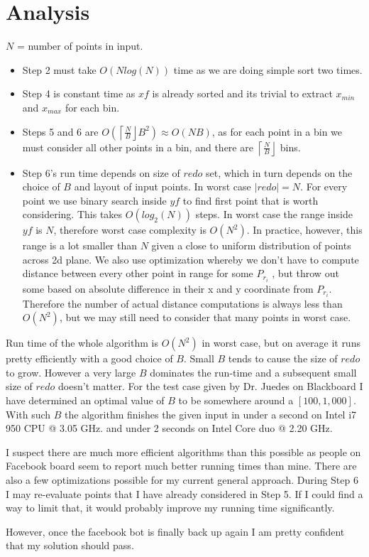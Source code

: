 \documentclass[11pt]{article}
\begin{document}
\section{Analysis}

$N$ = number of points in input.  
\begin{itemize}
\item Step 2 must take $O(Nlog(N))$ time as we are doing simple sort two times.  
\item Step 4 is constant time as $xf$ is already sorted and its trivial to extract $x_{min}$ and $x_{max}$ for each bin.  
\item Steps 5 and 6 are $O( \left \lceil \frac{N}{B} \right \rfloor B^2) \approx  O(NB) $, as for each point in a bin we must consider all other points in a bin, and there are $  \left \lceil \frac{N}{B} \right \rfloor $ bins.
\item Step 6's run time depends on size of $redo$ set, which in turn depends on the choice of $B$ and layout of input points.  In worst case $|redo|=N$.  For every point we use binary search inside $yf$ to find first point that is worth considering.  This takes $O(log_{2}(N))$ steps.  In worst case the range inside $yf$ is $N$, therefore worst case complexity is $O(N^2)$.  In practice, however, this range is a lot smaller than $N$ given a close to uniform distribution of points across 2d plane.  We also use optimization whereby we don't have to compute distance between every other point in range for some $P_{r_{i}}$ , but throw out some based on absolute difference in their x and y coordinate from $P_{r_{i}}$.  Therefore the number of actual distance computations is always less than $O(N^2)$, but we may still need to consider that many points in worst case.
\end{itemize}

Run time of the whole algorithm is $O(N^2)$ in worst case, but on average it runs pretty efficiently with a good choice of $B$.  Small $B$ tends to cause the size of $redo$ to grow.  However a very large $B$ dominates the run-time and a subsequent small size of $redo$ doesn't matter.  For the test case given by Dr. Juedes on Blackboard I have determined an optimal value of $B$ to be somewhere around a $[100,1,000]$.  With such $B$ the algorithm finishes the given input in under a second on Intel i7 950 CPU @ 3.05 GHz. and under 2 seconds on Intel Core duo @ 2.20 GHz.  

I suspect there are much more efficient algorithms than this possible as people on Facebook board seem to report much better running times than mine.  There are also a few optimizations possible for my current general approach.  During Step 6 I may re-evaluate points that I have already considered in Step 5.  If I could find a way to limit that, it would probably improve my running time significantly.

However, once the facebook bot is finally back up again I am pretty confident that my solution should pass.



\end{document}
